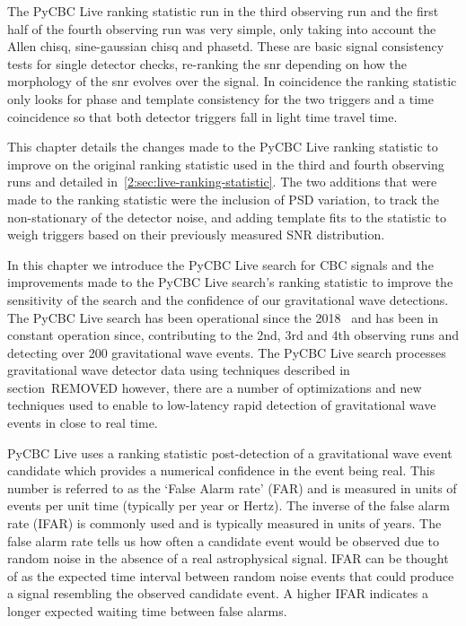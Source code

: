 The PyCBC Live ranking statistic run in the third observing run and the first half of the fourth observing run was very simple, only taking into account the Allen chisq, sine-gaussian chisq and phasetd. These are basic signal consistency tests for single detector checks, re-ranking the snr depending on how the morphology of the snr evolves over the signal. In coincidence the ranking statistic only looks for phase and template consistency for the two triggers and a time coincidence so that both detector triggers fall in light time travel time.



This chapter details the changes made to the PyCBC Live ranking statistic to improve on the original ranking statistic used in the third and fourth observing runs and detailed in~\ref{2:sec:live-ranking-statistic}. The two additions that were made to the ranking statistic were the inclusion of PSD variation, to track the non-stationary of the detector noise, and adding template fits to the statistic to weigh triggers based on their previously measured SNR distribution.

In this chapter we introduce the PyCBC Live search for CBC signals and the improvements made to the PyCBC Live search's ranking statistic to improve the sensitivity of the search and the confidence of our gravitational wave detections. The PyCBC Live search has been operational since the 2018~\cite{PyCBC_Live:2018} and has been in constant operation since, contributing to the 2nd, 3rd and 4th observing runs and detecting over 200 gravitational wave events. The PyCBC Live search processes gravitational wave detector data using techniques described in section~REMOVED however, there are a number of optimizations and new techniques used to enable to low-latency rapid detection of gravitational wave events in close to real time.

PyCBC Live uses a ranking statistic post-detection of a gravitational wave event candidate which provides a numerical confidence in the event being real. This number is referred to as the `False Alarm rate' (FAR) and is measured in units of events per unit time (typically per year or Hertz). The inverse of the false alarm rate (IFAR) is commonly used and is typically measured in units of years. The false alarm rate tells us how often a candidate event would be observed due to random noise in the absence of a real astrophysical signal. IFAR can be thought of as the expected time interval between random noise events that could produce a signal resembling the observed candidate event. A higher IFAR indicates a longer expected waiting time between false alarms.


